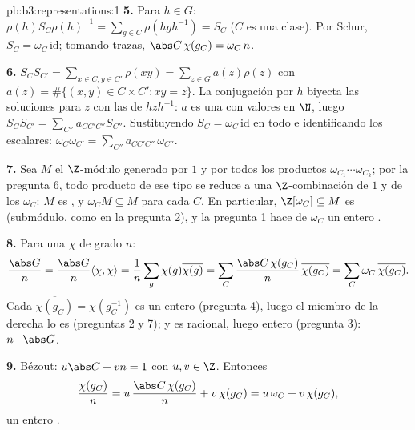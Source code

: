 \begin{solution}{pb:b3:representations:1}
\textbf{5.} Para $h \in G$: $\rho(h)S_C\rho(h)^{-1} = \sum_{g\in
C}\rho(hgh^{-1}) = S_C$ ($C$ es una clase). Por Schur, $S_C =
\omega_C\,\mathrm{id}$; tomando trazas, $\abs C\,\chi(g_C) =
\omega_C\, n$.

\textbf{6.} $S_CS_{C'} = \sum_{x \in C, y \in C'}\rho(xy) =
\sum_{z \in G} a(z)\rho(z)$ con $a(z) = \#\{(x,y) \in C\times
C' : xy = z\}$. La conjugación por $h$ biyecta las soluciones para $z$
con las de $hzh^{-1}$: $a$ es una
 con valores
en $\N$, luego $S_CS_{C'} = \sum_{C''}a_{CC'C''}S_{C''}$. Sustituyendo
$S_C = \omega_C\,\mathrm{id}$ en todo e identificando los escalares:
$\omega_C\omega_{C'} = \sum_{C''}a_{CC'C''}\,\omega_{C''}$.

\textbf{7.} Sea $M$ el $\Z$-módulo generado por $1$ y por todos los
productos $\omega_{C_1}\cdots\omega_{C_k}$; por la pregunta 6, todo
producto de ese tipo se reduce a una $\Z$-combinación de $1$ y de los
$\omega_C$: $M$ es , y
$\omega_C M
\subseteq M$ para cada $C$. En particular, $\Z[\omega_C]
\subseteq M$ es 
(submódulo, como en la pregunta 2), y la pregunta 1 hace de $\omega_C$
un entero .

\textbf{8.} Para una $\chi$
 de grado $n$:
\[
\frac{\abs G}{n} = \frac{\abs G}{n}\langle\chi,\chi\rangle
= \frac1n \sum_{g}\chi(g)\overline{\chi(g)}
= \sum_{C}\frac{\abs C\,\chi(g_C)}{n}\,\overline{\chi(g_C)}
= \sum_C \omega_C\,\overline{\chi(g_C)} .
\]
Cada $\overline{\chi(g_C)} = \chi(g_C^{-1})$ es un entero
 (pregunta 4), luego el
miembro de la derecha lo es (preguntas 2 y 7); y es racional, luego
entero (pregunta 3): $n \mid \abs
G$.

\textbf{9.} Bézout: $u\abs C + vn = 1$ con $u, v \in \Z$. Entonces
\[
\frac{\chi(g_C)}{n} = u\,\frac{\abs C\,\chi(g_C)}{n} +
v\,\chi(g_C) = u\,\omega_C + v\,\chi(g_C),
\]
un entero .


\end{solution}
